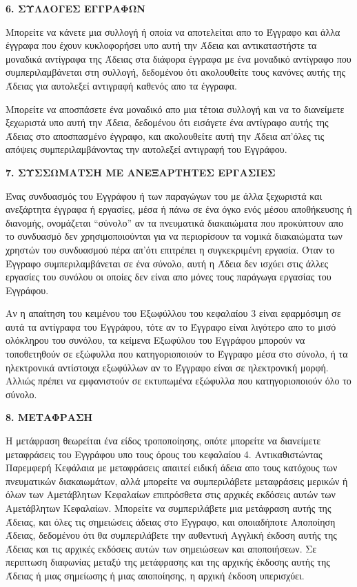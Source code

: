 \begin{center}
{\Large\bf 6. ΣΥΛΛΟΓΕΣ ΕΓΓΡΑΦΩΝ\par}
\end{center}

Μπορείτε να κάνετε μια συλλογή ή οποία να αποτελείται απο το Έγγραφο και άλλα έγγραφα που έχουν κυκλοφορήσει υπο αυτή την Άδεια και αντικαταστήστε τα μοναδικά αντίγραφα της Άδειας στα διάφορα έγγραφα με ένα μοναδικό αντίγραφο που συμπεριλαμβάνεται στη συλλογή, δεδομένου ότι ακολουθείτε τους κανόνες αυτής της Άδειας για αυτολεξεί αντιγραφή καθενός απο τα έγγραφα.

Μπορείτε να αποσπάσετε ένα μοναδικό απο μια τέτοια συλλογή και να το διανείμετε ξεχωριστά υπο αυτή την Άδεια, δεδομένου ότι εισάγετε ένα αντίγραφο αυτής της Άδειας στο αποσπασμένο έγγραφο, και ακολουθείτε αυτή την Άδεια απ'όλες τις απόψεις συμπεριλαμβάνοντας την αυτολεξεί αντιγραφή του Εγγράφου.


\begin{center}
{\Large\bf 7. ΣΥΣΣΩΜΑΤΣΗ ΜΕ ΑΝΕΞΑΡΤΗΤΕΣ ΕΡΓΑΣΙΕΣ\par}
\end{center}


Ένας συνδυασμός του Εγγράφου ή των παραγώγων του με άλλα ξεχωριστά και ανεξάρτητα έγγραφα ή εργασίες, μέσα ή πάνω σε ένα όγκο ενός μέσου αποθήκευσης ή διανομής, ονομάζεται “σύνολο” αν τα πνευματικά διακαιώματα που προκύπτουν απο το συνδυασμό δεν χρησιμοποιούνται για να περιορίσουν τα νομικά διακαιώματα των χρηστών του συνδυασμού πέρα απ'ότι επιτρέπει η συγκεκριμένη εργασία. Όταν το Έγγραφο συμπεριλαμβάνεται σε ένα σύνολο, αυτή η Άδεια δεν ισχύει στις άλλες εργασίες του συνόλου οι οποίες δεν είναι απο μόνες τους παράγωγα εργασίας του Εγγράφου.

Αν η απαίτηση του κειμένου του Εξωφύλλου του κεφαλαίου 3 είναι εφαρμόσιμη σε αυτά τα αντίγραφα του Εγγράφου, τότε αν το Έγγραφο είναι λιγότερο απο το μισό ολόκληρου του συνόλου, τα κείμενα Εξωφύλου του Εγγράφου μπορούν να τοποθετηθούν σε εξώφυλλα που κατηγοριοποιούν το Έγγραφο μέσα στο σύνολο, ή τα ηλεκτρονικά αντίστοιχα εξωφύλλων αν το Έγγραφο είναι σε ηλεκτρονική μορφή. Αλλιώς πρέπει να εμφανιστούν σε εκτυπωμένα εξώφυλλα που κατηγοριοποιούν όλο το σύνολο.


\begin{center}
{\Large\bf 8. ΜΕΤΑΦΡΑΣΗ\par}
\end{center}


Η μετάφραση θεωρείται ένα είδος τροποποίησης, οπότε μπορείτε να διανείμετε μεταφράσεις του Εγγράφου υπο τους όρους του κεφαλαίου 4. Αντικαθιστώντας Παρεμφερή Κεφάλαια με μεταφράσεις απαιτεί ειδική άδεια απο τους κατόχους των πνευματικών διακαιωμάτων, αλλά μπορείτε να συμπεριλάβετε μεταφράσεις μερικών ή όλων των Αμετάβλητων Κεφαλαίων επιπρόσθετα στις αρχικές εκδόσεις αυτών των Αμετάβλητων Κεφαλαίων. Μπορείτε να συμπεριλάβετε μια μετάφραση αυτής της Άδειας, και όλες τις σημειώσεις άδειας στο Έγγραφο, και οποιαδήποτε Αποποίηση Άδειας, δεδομένου ότι θα συμπεριλάβετε την αυθεντική Αγγλική έκδοση αυτής της Άδειας και τις αρχικές εκδόσεις αυτών των σημειώσεων και αποποιήσεων. Σε περιπτωση διαφωνίας μεταξύ της μετάφρασης και της αρχικής έκδοσης αυτής της Άδειας ή μιας σημείωσης ή μιας αποποίησης, η αρχική έκδοση υπερισχύει.

